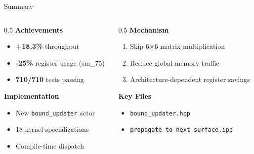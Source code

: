 \documentclass[aspectratio=169, table]{beamer}
\begin{document}
\begin{frame}{Summary}
\begin{columns}[T]
    \begin{column}{0.5\textwidth}
        \textbf{Achievements}
        \begin{itemize}
            \item \textcolor{acadgreen}{} \textbf{+18.3\%} throughput
            \item \textcolor{acadgreen}{} \textbf{-25\%} register usage (sm\_75)
            \item \textcolor{acadgreen}{} \textbf{710/710} tests passing
        \end{itemize}
        
        \vspace{1em}
        \textbf{Implementation}
        \begin{itemize}
            \item New \texttt{bound\_updater} actor
            \item 18 kernel specializations
            \item Compile-time dispatch
        \end{itemize}
    \end{column}

    \begin{column}{0.5\textwidth}
        \textbf{Mechanism}
        \begin{enumerate}
            \item Skip 6$\times$6 matrix multiplication
            \item Reduce global memory traffic
            \item Architecture-dependent register savings
        \end{enumerate}
        
        \vspace{1em}
        \textbf{Key Files}
        \begin{itemize}
            \item \texttt{bound\_updater.hpp}
            \item \texttt{propagate\_to\_next\_surface.ipp}
        \end{itemize}
    \end{column}
\end{columns}
\end{frame}
\end{document}
